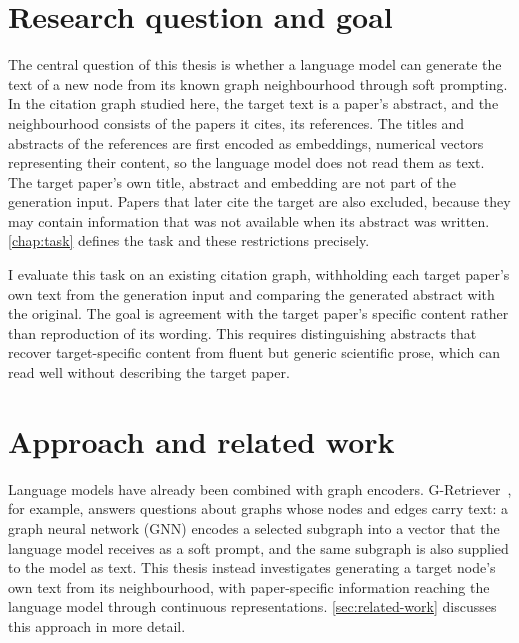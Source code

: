 \section{Research question and goal}
\label{sec:research-question}

The central question of this thesis is whether a language model can generate the text of a new node from its known graph neighbourhood through soft prompting. In the citation graph studied here, the target text is a paper's abstract, and the neighbourhood consists of the papers it cites, its references. The titles and abstracts of the references are first encoded as embeddings, numerical vectors representing their content, so the language model does not read them as text. The target paper's own title, abstract and embedding are not part of the generation input. Papers that later cite the target are also excluded, because they may contain information that was not available when its abstract was written. \autoref{chap:task} defines the task and these restrictions precisely.

I evaluate this task on an existing citation graph, withholding each target paper's own text from the generation input and comparing the generated abstract with the original. The goal is agreement with the target paper's specific content rather than reproduction of its wording. This requires distinguishing abstracts that recover target-specific content from fluent but generic scientific prose, which can read well without describing the target paper.

\section{Approach and related work}
\label{sec:approach}

Language models have already been combined with graph encoders. G-Retriever~\cite{he2024gretriever}, for example, answers questions about graphs whose nodes and edges carry text: a graph neural network (GNN) encodes a selected subgraph into a vector that the language model receives as a soft prompt, and the same subgraph is also supplied to the model as text. This thesis instead investigates generating a target node's own text from its neighbourhood, with paper-specific information reaching the language model through continuous representations. \autoref{sec:related-work} discusses this approach in more detail.

